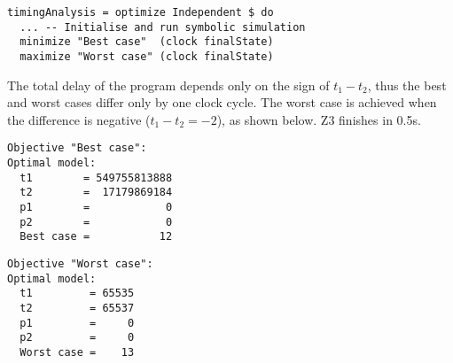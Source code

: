 \vspace{-0.5mm}
\begin{verbatim}
timingAnalysis = optimize Independent $ do
  ... -- Initialise and run symbolic simulation
  minimize "Best case"  (clock finalState)
  maximize "Worst case" (clock finalState)
\end{verbatim}
\vspace{-0.5mm}

\noindent
The total delay of the program depends only on the sign of $t_1 - t_2$, thus
the best and worst cases differ only by one clock cycle. The worst case is
achieved when the difference is negative ($t_1 - t_2 = -2$), as shown below.
Z3 finishes in 0.5s.

\vspace{2mm}
\noindent
\begin{minipage}{0.53\linewidth}
\begin{verbatim}
Objective "Best case":
Optimal model:
  t1        = 549755813888
  t2        =  17179869184
  p1        =            0
  p2        =            0
  Best case =           12
\end{verbatim}
\end{minipage}
\begin{minipage}{0.46\linewidth}
\begin{verbatim}
Objective "Worst case":
Optimal model:
  t1         = 65535
  t2         = 65537
  p1         =     0
  p2         =     0
  Worst case =    13
\end{verbatim}
\end{minipage}
